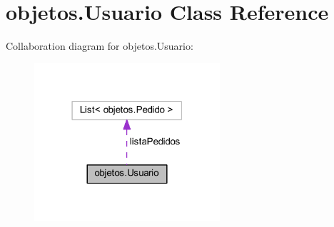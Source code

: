 \hypertarget{classobjetos_1_1_usuario}{}\section{objetos.\+Usuario Class Reference}
\label{classobjetos_1_1_usuario}


Collaboration diagram for objetos.\+Usuario\+:
\nopagebreak
\begin{figure}[H]
\begin{center}
\leavevmode
\includegraphics[width=195pt]{classobjetos_1_1_usuario__coll__graph}
\end{center}
\end{figure}
